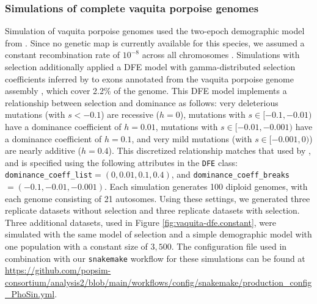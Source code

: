 \documentclass[hidelinks]{article}
\newcommand{\stdpopsim}{\texttt{stdpopsim}\xspace}
\newcommand{\snakemake}{\texttt{snakemake}\xspace}
\begin{document}
    \subsubsection*{Simulations of complete vaquita porpoise genomes}
    Simulation of vaquita porpoise genomes used
    the two-epoch demographic model from \citet[\stdpopsim label \texttt{Vaquita2Epoch\_1R22}]{robinson2022critically}.
    Since no genetic map is currently available for this species, we assumed a constant recombination rate of $10^{-8}$
    across all chromosomes \citep{morin2021}.
    Simulations with selection additionally applied a DFE model with gamma-distributed selection coefficients inferred by
    \citet[\stdpopsim label \texttt{Gamma\_R22}]{robinson2022critically} to exons annotated from the vaquita porpoise genome assembly
    \citet[\stdpopsim label \texttt{Phocoena\_sinus.mPhoSin1.pri.110\_exons}]{morin2021},
    which cover 2.2\% of the genome. 
    This DFE model implements a relationship between selection and dominance as follows:
    very deleterious mutations (with $s<-0.1$) are recessive ($h=0$),
    mutations with $s\in [-0.1,-0.01)$ have a dominance coefficient of $h=0.01$,
    mutations with $s\in [-0.01,-0.001)$ have a dominance coefficient of $h=0.1$,
    and very mild mutations (with $s\in [-0.001,0)$) are nearly additive ($h=0.4$).
    This discretized relationship matches that used by \textcite{robinson2022critically},
    and is specified using the following attributes in the \texttt{DFE} class:
    \texttt{dominance\_coeff\_list}$=(0,0.01,0.1,0.4)$, and
    \texttt{dominance\_coeff\_breaks}$=(-0.1,-0.01,-0.001)$.
    Each simulation generates 100 diploid genomes,
    with each genome consisting of 21 autosomes.
    Using these settings, we generated three replicate datasets without selection
    and three replicate datasets with selection.
    Three additional datasets, used in Figure \ref{fig:vaquita-dfe.constant},
    were simulated with the same model of selection and a simple demographic model with one population with a constant size of $3,500$.
    The configuration file used in combination with our \snakemake workflow
    for these simulations can be found at
    \url{https://github.com/popsim-consortium/analysis2/blob/main/workflows/config/snakemake/production_config_PhoSin.yml}.
\end{document}
